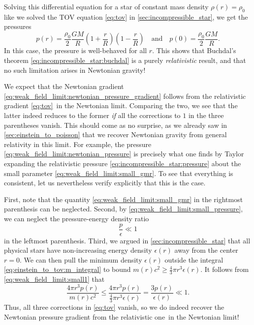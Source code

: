 Solving this differential equation for a star of constant mass density $\rho(r) = \rho_0$ like we solved the TOV equation \eqref{eq:tov} in \cref{sec:incompressible_star}, we get the pressures
\begin{equation}
	p(r) = \frac{\rho_0}{2} \frac{G M}{R} \left( 1 + \frac{r}{R} \right) \left( 1 - \frac{r}{R} \right)
	\quad \text{and} \quad
	p(0) = \frac{\rho_0}{2} \frac{GM}{R} .
	\label{eq:weak_field_limit:newtonian_pressure}
\end{equation}
In this case, the pressure is well-behaved for all $r$.
This shows that Buchdal's theorem \eqref{eq:incompressible_star:buchdal} is a purely \emph{relativistic} result, and that no such limitation arises in Newtonian gravity!


We expect that the Newtonian gradient \eqref{eq:weak_field_limit:newtonian_pressure_gradient} follows from the relativistic gradient \eqref{eq:tov} in the Newtonian limit.
Comparing the two, we see that the latter indeed reduces to the former \emph{if} all the corrections to $1$ in the three parentheses vanish.
This should come as no surprise, as we already saw in \cref{sec:einstein_to_poisson} that we recover Newtonian gravity from general relativity in this limit.
For example, the pressure \eqref{eq:weak_field_limit:newtonian_pressure} is precisely what one finds by Taylor expanding the relativistic pressure \eqref{eq:incompressible_star:pressure} about the small parameter \eqref{eq:weak_field_limit:small_gmr}.
To see that everything is consistent, let us nevertheless verify explicitly that this is the case.

First, note that the quantity \eqref{eq:weak_field_limit:small_gmr} in the rightmost parenthesis can be neglected.
Second, by \cref{eq:weak_field_limit:small_pressure}, we can neglect the pressure-energy density ratio
\begin{equation}
	\frac{p}{\epsilon} \ll 1
	\label{eq:weak_field_limit:small1}
\end{equation}
in the leftmost parenthesis.
Third, we argued in \cref{sec:incompressible_star} that all physical stars have non-increasing energy density $\epsilon(r)$ away from the center $r=0$.
We can then pull the minimum density $\epsilon(r)$ outside the integral \eqref{eq:einstein_to_tov:m_integral} to bound $m(r) c^2 \geq \frac{4}{3} \pi r^3 \epsilon(r)$.
It follows from \cref{eq:weak_field_limit:small1} that
\begin{equation}
	\frac{4 \pi r^3 p(r)}{m(r) c^2} \leq \frac{4 \pi r^3 p(r)}{\frac{4}{3} \pi r^3 \epsilon(r)}
	                                =    \frac{3 p(r)}{\epsilon(r)}
						            \ll  1 .
	\label{eq:weak_field_limit:small2}
\end{equation}
Thus, all three corrections in \cref{eq:tov} vanish, so we do indeed recover the Newtonian pressure gradient from the relativistic one in the Newtonian limit!

